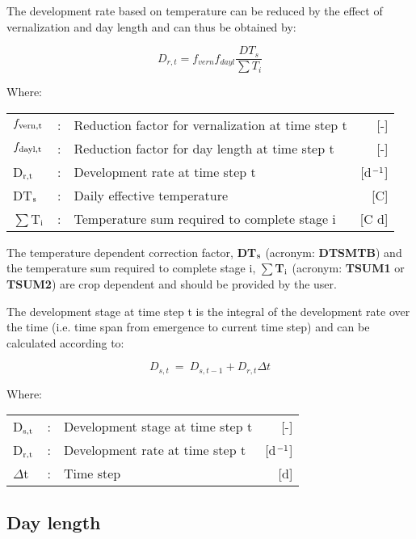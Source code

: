 The development rate based on temperature can be reduced by the effect of vernalization and 
day length and can thus be obtained by:

\begin{equation}
\label{eq:5.3}
D_{r,t} = {f_{vern}}{f_{dayl}}{\frac{DT_{s}}{\sum T_{i}}}
\end{equation}

Where:\\[5pt]
\begin{tabularx}{\textwidth}{llXr}
	$f_{{\rm vern,t}}$ &:& Reduction factor for vernalization at time step t  & [-]\\
	$f_{{\rm dayl,t}}$ &:& Reduction factor for day length at time step t  & [-]\\
	D$_{{\rm r,t}}$ &:& Development rate at time step t  & [d$^{{\rm -1}}$]\\
	DT$_{{\rm s}}$ &:& Daily effective temperature & [\textdegree C]\\
	$\sum$T$_{{\rm i}}$ &:& Temperature sum required to complete stage i & [\textdegree C d]\\
\end{tabularx}

The temperature dependent correction factor, {\bf DT$_{{\rm s}}$} (acronym: {\bf DTSMTB}) and 
the temperature sum required to complete stage i, {\bf $\sum$T$_{{\rm i}}$} (acronym: 
{\bf TSUM1} or {\bf TSUM2}) are crop dependent and should be provided by the user.

The development stage at time step t is the integral of the development rate over the time
(i.e. time span from emergence to current time step) and can be calculated according to:

\begin{equation}
\label{eq:5.4}
D_{s,t} ~=~ D_{s,t-1} + D_{r,t} \Delta t
\end{equation}

Where:\\[5pt]
\begin{tabularx}{\textwidth}{llXr}
	D$_{{\rm s,t}}$ &:& Development stage at time step t    &    [-]\\
	D$_{{\rm r,t}}$ &:& Development rate at time step t     &   [d$^{{\rm -1}}$]\\
	$\Delta$t &:& Time step   &     [d]\\
\end{tabularx}

\subsection{Day length}


